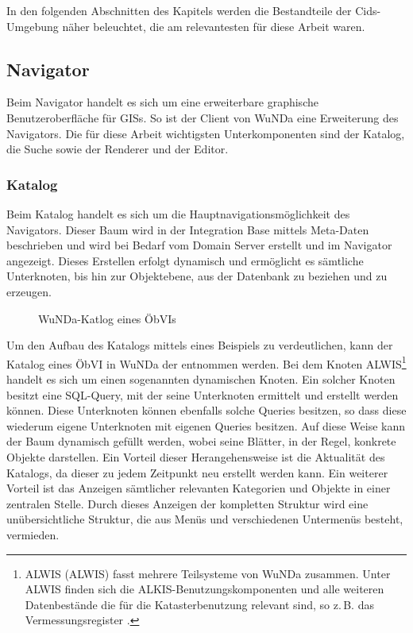In den folgenden Abschnitten des Kapitels werden die Bestandteile der Cids-Umgebung näher beleuchtet, die am relevantesten für diese Arbeit waren.

\subsection{Navigator}
Beim Navigator handelt es sich um eine erweiterbare graphische Benutzeroberfläche für \acp{GIS}. So ist der Client von \ac{WuNDa} eine Erweiterung des Navigators. Die für diese Arbeit wichtigsten Unterkomponenten sind der Katalog, die Suche sowie der Renderer und der Editor.

\subsubsection{Katalog} \label{subsubsec:katalog}
Beim Katalog handelt es sich um die Hauptnavigationsmöglichkeit des Navigators.
Dieser Baum wird in der Integration Base mittels Meta-Daten beschrieben und wird bei Bedarf vom Domain Server erstellt und im Navigator angezeigt.
Dieses Erstellen erfolgt dynamisch und ermöglicht es sämtliche Unterknoten, bis hin zur Objektebene, aus der Datenbank zu beziehen und zu erzeugen.

\begin{figure}[htb]
	\centering
	\caption{WuNDa-Katlog eines ÖbVIs}
	\label{fig:katlog-oebvi}
\end{figure}

Um den Aufbau des Katalogs mittels eines Beispiels zu verdeutlichen, kann der Katalog eines \ac{ÖbVI} in \ac{WuNDa} der  entnommen werden.
Bei dem Knoten \acs{ALWIS}\footnote{\acs{ALWIS} (\acl{ALWIS}) fasst mehrere Teilsysteme von \ac{WuNDa} zusammen. Unter \acs{ALWIS} finden sich die ALKIS-Benutzungskomponenten und alle weiteren Datenbestände die für die Katasterbenutzung relevant sind, so z.\,B. das Vermessungsregister \autocite[vgl.][]{wupp-wunda-oebvi}.} handelt es sich um einen sogenannten dynamischen Knoten.
Ein solcher Knoten besitzt eine SQL-Query, mit der seine Unterknoten ermittelt und erstellt werden können.
Diese Unterknoten können ebenfalls solche Queries besitzen, so dass diese wiederum eigene Unterknoten mit eigenen Queries besitzen.
Auf diese Weise kann der Baum dynamisch gefüllt werden, wobei seine Blätter, in der Regel, konkrete Objekte darstellen.
Ein Vorteil dieser Herangehensweise ist die Aktualität des Katalogs, da dieser zu jedem Zeitpunkt neu erstellt werden kann.
Ein weiterer Vorteil ist das Anzeigen sämtlicher relevanten Kategorien und Objekte in einer zentralen Stelle.
Durch dieses Anzeigen der kompletten Struktur wird eine unübersichtliche Struktur, die aus Menüs und verschiedenen Untermenüs besteht, vermieden.

